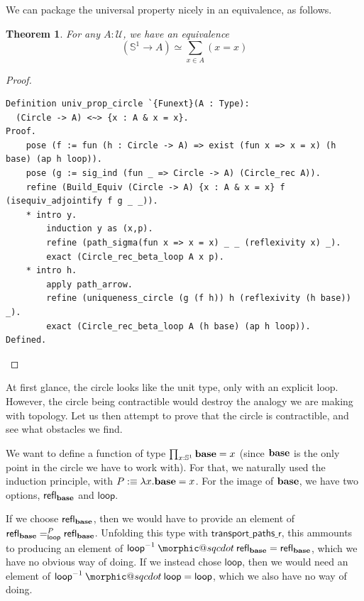 \documentclass[12 pt]{amsart}
\makeatletter
\newtheorem{theorem}[subsubsection]{Theorem}
\theoremstyle{definition}
\theoremstyle{remark}
\newcommand{\Type}{\mathcal{U}}
\newcommand{\base}{\mathsf{\bf base}}
\newcommand{\C}{{\mathbb{S}^1}}
\newcommand{\lo}{\mathsf{ loop}}
\newcommand{\ap}{\mathsf{ap}}
\newcommand{\refl}{\mathsf{refl}}
\newcommand{\transportpathsr}{\mathsf{transport\_paths\_r}}
\DeclareRobustCommand{\conc}{\mathbin{\mathpalette\morphic@sqcdot\relax}}
\newcommand{\morphic@sqcdot}[2]{%
    \sbox\z@{$\m@th#1\centerdot$}%
    \ht\z@=.33333\ht\z@
    \vcenter{\box\z@}%
    }
\makeatother
\begin{document}


We can package the universal property nicely in an equivalence, as follows.

\begin{theorem}
For any $A:\Type$, we have an equivalence
\[(\C \to A) \simeq \sum_{x \in A} (x = x)\]
\end{theorem}

\begin{proof}
\begin{lstlisting}
Definition univ_prop_circle `{Funext}(A : Type): 
  (Circle -> A) <~> {x : A & x = x}.
Proof.
    pose (f := fun (h : Circle -> A) => exist (fun x => x = x) (h base) (ap h loop)).
    pose (g := sig_ind (fun _ => Circle -> A) (Circle_rec A)).
    refine (Build_Equiv (Circle -> A) {x : A & x = x} f  (isequiv_adjointify f g _ _)).
    * intro y.
        induction y as (x,p).
        refine (path_sigma(fun x => x = x) _ _ (reflexivity x) _).
        exact (Circle_rec_beta_loop A x p).
    * intro h.
        apply path_arrow.
        refine (uniqueness_circle (g (f h)) h (reflexivity (h base)) _).
        exact (Circle_rec_beta_loop A (h base) (ap h loop)).
Defined.
\end{lstlisting}
\end{proof}

At first glance, the circle looks like the unit type, only with an explicit loop. However, the circle being contractible would destroy the analogy we are making with topology. Let us then attempt to prove that the circle is contractible, and see what obstacles we find.

We want to define a function of type $\prod_{x:\C} \base = x$ (since $\base$ is the only point in the circle we have to work with). For that, we naturally used the induction principle, with $P :\equiv \lambda x. \base = x$. For the image of $\base$, we have two options, $\refl_\base$ and $\lo$.

If we choose $\refl_\base$, then we would have to provide an element of $\refl_\base =^P_\lo \refl_\base$. Unfolding this type with $\transportpathsr$, this ammounts to producing an element of $\lo^{-1}\conc \refl_\base = \refl_\base$, which we have no obvious way of doing. If we instead chose $\lo$, then we would need an element of $\lo^{-1}\conc \lo = \lo$, which we also have no way of doing.
\end{document}
